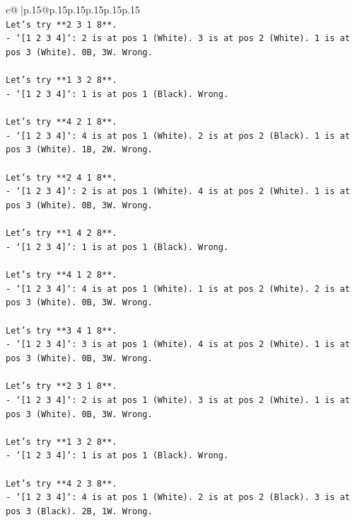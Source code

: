\documentclass{article}
\begin{document}
{\begin{supertabular}{c@{$\;$}|p{.15\linewidth}@{}p{.15\linewidth}p{.15\linewidth}p{.15\linewidth}p{.15\linewidth}p{.15\linewidth}}
{{{\\ 
\texttt{Let's try **2 3 1 8**.} \\
\texttt{{-} `{[}1 2 3 4{]}`: 2 is at pos 1 (White). 3 is at pos 2 (White). 1 is at pos 3 (White). 0B, 3W. Wrong.} \\
\\ 
\texttt{Let's try **1 3 2 8**.} \\
\texttt{{-} `{[}1 2 3 4{]}`: 1 is at pos 1 (Black). Wrong.} \\
\\ 
\texttt{Let's try **4 2 1 8**.} \\
\texttt{{-} `{[}1 2 3 4{]}`: 4 is at pos 1 (White). 2 is at pos 2 (Black). 1 is at pos 3 (White). 1B, 2W. Wrong.} \\
\\ 
\texttt{Let's try **2 4 1 8**.} \\
\texttt{{-} `{[}1 2 3 4{]}`: 2 is at pos 1 (White). 4 is at pos 2 (White). 1 is at pos 3 (White). 0B, 3W. Wrong.} \\
\\ 
\texttt{Let's try **1 4 2 8**.} \\
\texttt{{-} `{[}1 2 3 4{]}`: 1 is at pos 1 (Black). Wrong.} \\
\\ 
\texttt{Let's try **4 1 2 8**.} \\
\texttt{{-} `{[}1 2 3 4{]}`: 4 is at pos 1 (White). 1 is at pos 2 (White). 2 is at pos 3 (White). 0B, 3W. Wrong.} \\
\\ 
\texttt{Let's try **3 4 1 8**.} \\
\texttt{{-} `{[}1 2 3 4{]}`: 3 is at pos 1 (White). 4 is at pos 2 (White). 1 is at pos 3 (White). 0B, 3W. Wrong.} \\
\\ 
\texttt{Let's try **2 3 1 8**.} \\
\texttt{{-} `{[}1 2 3 4{]}`: 2 is at pos 1 (White). 3 is at pos 2 (White). 1 is at pos 3 (White). 0B, 3W. Wrong.} \\
\\ 
\texttt{Let's try **1 3 2 8**.} \\
\texttt{{-} `{[}1 2 3 4{]}`: 1 is at pos 1 (Black). Wrong.} \\
\\ 
\texttt{Let's try **4 2 3 8**.} \\
\texttt{{-} `{[}1 2 3 4{]}`: 4 is at pos 1 (White). 2 is at pos 2 (Black). 3 is at pos 3 (Black). 2B, 1W. Wrong.} \\
\\ 
}}}
\end{supertabular}}
\end{document}
